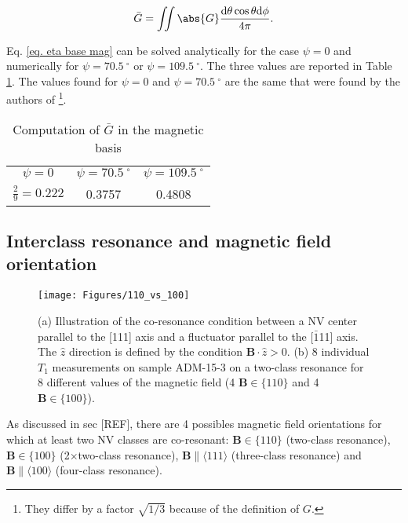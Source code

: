 \documentclass[a4paper,11pt]{report}
\begin{document}
\begin{equation}
\label{eq. eta base mag}
\bar{G}= \iint \abs{G} \frac{\rm d\theta \cos \theta \rm d\phi}{4 \pi}.
\end{equation}

Eq. \ref{eq. eta base mag} can be solved analytically for the case $\psi=0$ and numerically for $\psi=70.5 \ ^\circ$ or $\psi=109.5 \ ^\circ$. The three values are reported in Table \ref{table G mag}. The values found for $\psi=0$ and $\psi=70.5 \ ^\circ$ are the same that were found by the authors of \citep{choi2017depolarization} \footnote{They differ by a factor $\sqrt{1/3}$ because of the definition of $G$.}.

\begin{table}[htbp]
\centering
\caption{Computation of $\bar G$ in the magnetic basis}
 \label{table G mag}
\begin{tabular}{c|c|c}
\toprule
$\psi=0$ & $\psi=70.5 \ ^\circ$ & $\psi=109.5 \ ^\circ$ \\

$\frac{2}{9}=0.222$ & 0.3757 & 0.4808 \\
\bottomrule
\end{tabular}
\end{table}

\subsection{Interclass resonance and magnetic field orientation}

\begin{figure}[h!]
\centering
\texttt{[image: Figures/110\_vs\_100]}
\caption{(a) Illustration of the co-resonance condition between a NV center parallel to the [111] axis and a fluctuator parallel to the [$\bar 1$11] axis. The $\hat z$ direction is defined by the condition $\mathbf{B}\cdot\hat{z} >0$. (b) 8 individual $T_1$ measurements on sample ADM-15-3 on a two-class resonance for 8 different values of the magnetic field (4 $\mathbf{B} \in \{110\}$ and 4 $\mathbf{B} \in \{100\}$).}
\label{110 vs 100 annexe}
\end{figure}

As discussed in sec [REF], there are 4 possibles magnetic field orientations for which at least two NV classes are co-resonant: $\mathbf{B} \in \{110\}$ (two-class resonance), $\mathbf{B} \in \{100\}$ (2$\times$two-class resonance), $\mathbf{B} \parallel \langle 111 \rangle$ (three-class resonance) and $\mathbf{B} \parallel \langle 100\rangle$ (four-class resonance).
\end{document}
